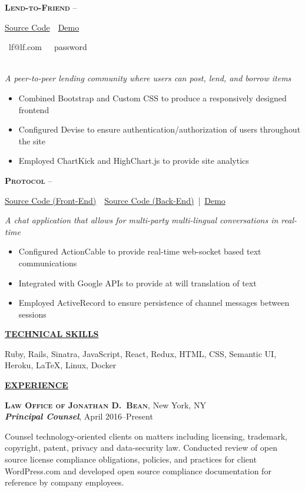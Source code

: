 \documentclass[11pt,letterpaper,english]{article}
\newenvironment{resumelist}[1]
{\begin{list}{}
{\setlength\itemsep{0pt}
\setlength\topsep{0pt}
\setlength\parskip{0pt}
\setlength\parsep{0pt}
\settowidth{\labelwidth}{#1}
 \setlength{\leftmargin}{\labelwidth}
 \addtolength{\leftmargin}{\labelsep}
 \renewcommand{\makelabel}[1]{##1\hfil}}}
{\end{list}}
\begin{document}
\textbf{\textsc{Lend-to-Friend}} 
--\begin{small}
\href{https://github.com/jdbean/lend-to-friend}{Source Code}~\color{darkgray}{|}~\href{https://pacific-earth-11787.herokuapp.com/}{Demo}
\end{small}
\begin{scriptsize}
\color{gray}
\faUser~lf@lf.com~~\faKey~password
\end{scriptsize}\\
\textit{A peer-to-peer lending community where users can post, lend, and borrow items}
\begin{itemize}
\item Combined Bootstrap and Custom CSS to produce a responsively designed frontend
\item Configured Devise to ensure authentication/authorization of users throughout the site
\item Employed ChartKick and HighChart.js to provide site analytics
\end{itemize}
\smallskip

\textbf{\textsc{Protocol}} 
--\begin{small}
\href{https://github.com/jdbean/protocol-frontend}{Source Code (Front-End)}~\color{darkgray}{|}~\href{https://github.com/jdbean/protocol-backend}{Source Code (Back-End)}~|~\href{https://www.youtube.com/watch?v=vMI0HT0UjEM}{Demo}\\
\end{small}
\textit{A chat application that allows for multi-party multi-lingual conversations in real-time}
\begin{itemize}
\item Configured ActionCable to provide real-time web-socket based text communications
\item Integrated with Google APIs to provide at will translation of text
\item Employed ActiveRecord to ensure persistence of channel messages between sessions
\end{itemize}
\bigskip

\label{Skills}
\underline{\textbf{\textsc{\large TECHNICAL SKILLS}}}{\large \par}
\smallskip
Ruby, Rails, Sinatra, JavaScript, React, Redux, HTML, CSS, Semantic UI, Heroku, \LaTeX, Linux, Docker
\bigskip

\label{Experience}
\underline{\textbf{\textsc{\large EXPERIENCE}}}{\large \par}
\smallskip

\textbf{\textsc{Law Office of Jonathan D.\ Bean}}, New York, NY\\\nopagebreak
\textbf{\textit{Principal Counsel}}, April 2016--Present%
\begin{resumelist}{M}
\item    
Counsel technology-oriented clients on matters including licensing, trademark, copyright, patent, privacy and data-security law. Conducted review of open source license compliance obligations, policies, and practices for client WordPress.com and developed open source compliance documentation for reference by company employees.
\end{resumelist}
\smallskip
\end{document}
